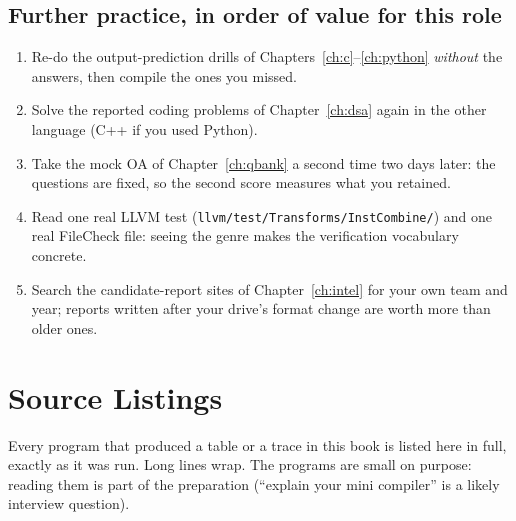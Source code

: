 \documentclass[10pt,a4paper,openany,oneside]{report}
\begin{document}
\section{Further practice, in order of value for this role}
\begin{enumerate}[nosep]
\item Re-do the output-prediction drills of Chapters~\ref{ch:c}--\ref{ch:python} \emph{without} the answers, then compile the ones you missed.
\item Solve the reported coding problems of Chapter~\ref{ch:dsa} again in the other language (C++ if you used Python).
\item Take the mock OA of Chapter~\ref{ch:qbank} a second time two days later: the questions are fixed, so the second score measures what you retained.
\item Read one real LLVM test (\texttt{llvm/test/Transforms/InstCombine/}) and one real FileCheck file: seeing the genre makes the verification vocabulary concrete.
\item Search the candidate-report sites of Chapter~\ref{ch:intel} for your own team and year; reports written after your drive's format change are worth more than older ones.
\end{enumerate}


\chapter{Source Listings}
\label{app:listings}

Every program that produced a table or a trace in this book is listed here in full, exactly as it was run. Long lines wrap. The programs are small on purpose: reading them is part of the preparation (``explain your mini compiler'' is a likely interview question).
\end{document}

